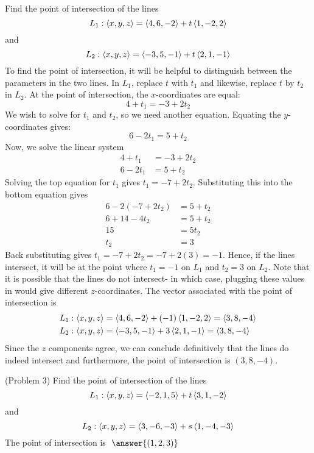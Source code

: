\documentclass[handout]{ximera}
\begin{document}
\begin{example}[Example 3]
Find the point of intersection of the lines
\[
L_1: \left\langle x, y, z\right\rangle = \left\langle 4, 6, -2\right\rangle + t\left\langle 1, -2, 2\right\rangle
\]
and 
\[
L_2: \left\langle x, y, z\right\rangle = \left\langle -3, 5, -1\right\rangle + t\left\langle 2, 1, -1\right\rangle
\]
To find the point of intersection, it will be helpful to distinguish between the parameters in the two lines.
In $L_1$, replace $t$ with $t_1$ and likewise, replace $t$ by $t_2$ in $L_2$. 
At the point of intersection, the $x$-coordinates are equal:
\[
4+t_1 = -3 + 2t_2
\]
We wish to solve for $t_1$ and $t_2$, so we need another equation. Equating the $y$-coordinates gives:
\[
6 -2t_1 = 5 + t_2
\]
Now, we solve the linear system
\begin{align*}
4+t_1 &= -3 + 2t_2\\
6 -2t_1 &= 5 + t_2
\end{align*}
Solving the top equation for $t_1$ gives $t_1 = -7 + 2t_2$.  Substituting this into the bottom equation gives
\begin{align*}
6 - 2(-7+2t_2) &= 5 + t_2\\
6 + 14 - 4t_2 & = 5 + t_2\\
15 &= 5t_2\\
t_2 &=3
\end{align*}
Back substituting gives $t_1 = -7 + 2t_2 = -7 + 2(3) = -1$.
Hence, if the lines intersect, it will be at the point where $t_1 = -1$ on $L_1$ and $t_2 = 3$ on $L_2$.
Note that it is possible that the lines do not intersect- in which case, plugging these values in would 
give different $z$-coordinates.
The vector associated with the point of intersection is
\begin{align*}
L_1: \left\langle x, y, z\right\rangle &= \left\langle 4, 6, -2\right\rangle + (-1)\left\langle 1, -2, 2\right\rangle = \left\langle 3, 8, -4\right\rangle\\
L_2: \left\langle x, y, z\right\rangle &= \left\langle -3, 5, -1\right\rangle + 3\left\langle 2, 1, -1\right\rangle = \left\langle 3, 8, -4\right\rangle
\end{align*}
Since the $z$ components agree, we can conclude definitively that the lines do indeed intersect and furthermore, 
the point of intersection is $(3, 8, -4)$.
\end{example}

\begin{problem}(Problem 3)
Find the point of intersection of the lines
\[
L_1: \left\langle x, y, z\right\rangle = \left\langle -2, 1, 5\right\rangle + t\left\langle 3, 1, -2\right\rangle
\]
and 
\[
L_2: \left\langle x, y, z\right\rangle = \left\langle 3, -6, -3\right\rangle + s\left\langle 1, -4, -3\right\rangle
\]
The point of intersection is $\;\answer{(1, 2, 3)}$
\end{problem}
\end{document}
